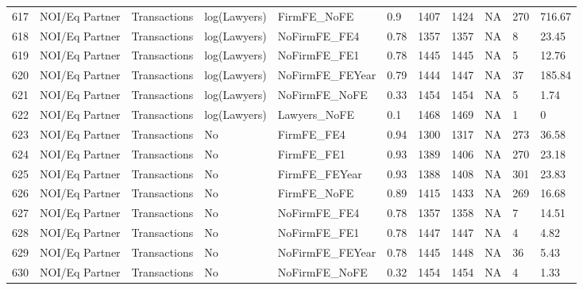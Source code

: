 \documentclass{article}
\begin{document}
\begin{table}[H]
\begin{tabular}{rllllllllll}
  617 & NOI/Eq Partner & Transactions & log(Lawyers) & FirmFE\_NoFE & 0.9 & 1407 & 1424 & NA & 270 & 716.67 \\ 
  618 & NOI/Eq Partner & Transactions & log(Lawyers) & NoFirmFE\_FE4 & 0.78 & 1357 & 1357 & NA & 8 & 23.45 \\ 
  619 & NOI/Eq Partner & Transactions & log(Lawyers) & NoFirmFE\_FE1 & 0.78 & 1445 & 1445 & NA & 5 & 12.76 \\ 
  620 & NOI/Eq Partner & Transactions & log(Lawyers) & NoFirmFE\_FEYear & 0.79 & 1444 & 1447 & NA & 37 & 185.84 \\ 
  621 & NOI/Eq Partner & Transactions & log(Lawyers) & NoFirmFE\_NoFE & 0.33 & 1454 & 1454 & NA & 5 & 1.74 \\ 
  622 & NOI/Eq Partner & Transactions & log(Lawyers) & Lawyers\_NoFE & 0.1 & 1468 & 1469 & NA & 1 & 0 \\ 
  623 & NOI/Eq Partner & Transactions & No & FirmFE\_FE4 & 0.94 & 1300 & 1317 & NA & 273 & 36.58 \\ 
  624 & NOI/Eq Partner & Transactions & No & FirmFE\_FE1 & 0.93 & 1389 & 1406 & NA & 270 & 23.18 \\ 
  625 & NOI/Eq Partner & Transactions & No & FirmFE\_FEYear & 0.93 & 1388 & 1408 & NA & 301 & 23.83 \\ 
  626 & NOI/Eq Partner & Transactions & No & FirmFE\_NoFE & 0.89 & 1415 & 1433 & NA & 269 & 16.68 \\ 
  627 & NOI/Eq Partner & Transactions & No & NoFirmFE\_FE4 & 0.78 & 1357 & 1358 & NA & 7 & 14.51 \\ 
  628 & NOI/Eq Partner & Transactions & No & NoFirmFE\_FE1 & 0.78 & 1447 & 1447 & NA & 4 & 4.82 \\ 
  629 & NOI/Eq Partner & Transactions & No & NoFirmFE\_FEYear & 0.78 & 1445 & 1448 & NA & 36 & 5.43 \\ 
  630 & NOI/Eq Partner & Transactions & No & NoFirmFE\_NoFE & 0.32 & 1454 & 1454 & NA & 4 & 1.33 \\ 
   \hline
\end{tabular}
\end{table}
\end{document}
